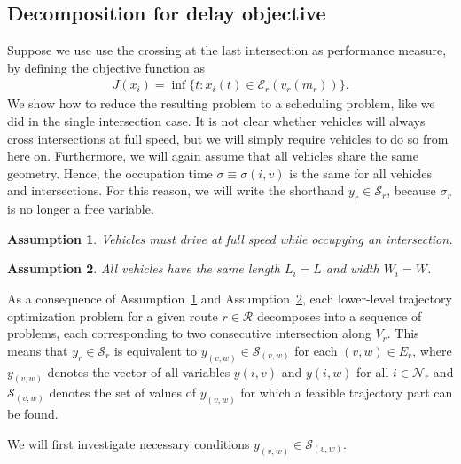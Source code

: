 \documentclass[a4paper]{article}
\theoremstyle{definition}
\theoremstyle{plain}
\newtheorem{assump}{Assumption}[section]
\begin{document}
\subsection{Decomposition for delay objective}

Suppose we use use the crossing at the last intersection as performance measure, by defining the
objective function as
\begin{align*}
  J(x_{i}) = \inf \{ t: x_{i}(t) \in \mathcal{E}_{r}(v_{r}(m_{r}))\} .
\end{align*}
%
We show how to reduce the resulting problem to a scheduling problem, like we did
in the single intersection case.
%
It is not clear whether vehicles will always cross intersections at full speed,
but we will simply require vehicles to do so from here on.
Furthermore, we will again assume that all vehicles share the same geometry.
Hence, the
occupation time $\sigma \equiv \sigma(i,v)$ is the same for all vehicles and
intersections. For this reason, we will write the shorthand $y_{r} \in \mathcal{S}_{r}$,
because $\sigma_{r}$ is no longer a free variable.

\begin{assump}
  \label{assump:full_speed}
  Vehicles must drive at full speed while occupying an intersection.
\end{assump}

\begin{assump}
  \label{assump:same_geometry}
  All vehicles have the same length $L_{i} = L$ and width $W_{i} = W$.
\end{assump}

%
As a consequence of Assumption~\ref{assump:full_speed} and Assumption~\ref{assump:same_geometry},
each lower-level trajectory optimization problem for a given route
$r \in \mathcal{R}$ decomposes into a sequence of problems, each corresponding to
two consecutive intersection along $V_{r}$.
%
This means that $y_{r} \in \mathcal{S}_{r}$ is equivalent to
$y_{(v,w)} \in \mathcal{S}_{(v,w)}$ for each $(v,w) \in E_{r}$, where
$y_{(v,w)}$ denotes the vector of all variables $y(i, v)$ and $y(i, w)$ for all
$i \in \mathcal{N}_{r}$ and $\mathcal{S}_{(v,w)}$ denotes the set of values of $y_{(v,w)}$ for which a feasible trajectory part can be found.

We will first investigate necessary conditions $y_{(v,w)} \in \mathcal{S}_{(v,w)}$.











\end{document}
